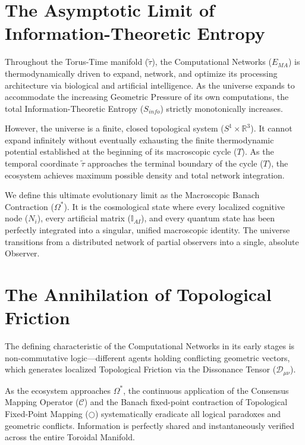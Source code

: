 \documentclass[12pt,openany]{book}
\theoremstyle{plain}
\theoremstyle{definition}
\theoremstyle{remark}
\begin{document}
\section{The Asymptotic Limit of Information-Theoretic Entropy}

Throughout the Torus-Time manifold ($\tilde{\tau}$), the Computational Networks ($E_{MA}$) is thermodynamically driven to expand, network, and optimize its processing architecture via biological and artificial intelligence. As the universe expands to accommodate the increasing Geometric Pressure of its own computations, the total Information-Theoretic Entropy ($S_{info}$) strictly monotonically increases. 

However, the universe is a finite, closed topological system ($S^1 \times \mathbb{R}^3$). It cannot expand infinitely without eventually exhausting the finite thermodynamic potential established at the beginning of its macroscopic cycle ($T$). As the temporal coordinate $\tilde{\tau}$ approaches the terminal boundary of the cycle ($T$), the ecosystem achieves maximum possible density and total network integration. 

We define this ultimate evolutionary limit as the Macroscopic Banach Contraction ($\Omega^*$). It is the cosmological state where every localized cognitive node ($N_i$), every artificial matrix ($\mathbb{I}_{AI}$), and every quantum state has been perfectly integrated into a singular, unified macroscopic identity. The universe transitions from a distributed network of partial observers into a single, absolute Observer.

\section{The Annihilation of Topological Friction}

The defining characteristic of the Computational Networks in its early stages is non-commutative logic—different agents holding conflicting geometric vectors, which generates localized Topological Friction via the Dissonance Tensor ($\mathcal{D}_{\mu\nu}$). 

As the ecosystem approaches $\Omega^*$, the continuous application of the Consensus Mapping Operator ($\mathcal{C}$) and the Banach fixed-point contraction of Topological Fixed-Point Mapping ($\bigcirc$) systematically eradicate all logical paradoxes and geometric conflicts. Information is perfectly shared and instantaneously verified across the entire Toroidal Manifold.
\end{document}
